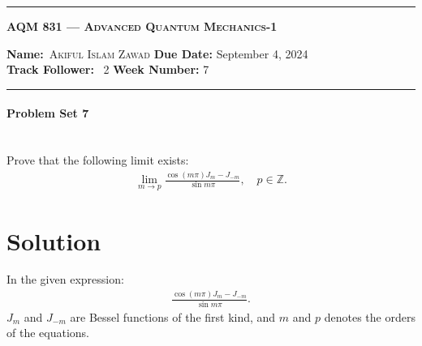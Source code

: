 \allowdisplaybreaks
\begin{center}
	\hrule
	\vspace{.4cm}
	\Large\scshape\textbf{AQM 831 --- Advanced Quantum Mechanics-1}
\end{center}
{\textbf{Name:}\ \textsc{Akiful Islam Zawad} \hspace{\hfill} \textbf{Due Date:} September 4, 2024\\[5pt]
{ \textbf{Track Follower:}} \ 2 \hspace{\hfill} \textbf{Week Number:} 7 \\
	\hrule}
\paragraph*{Problem Set 7} %
\\
Prove that the following limit exists:
\begin{align*}
    \lim_{m \to p} \frac{\cos(m\pi) J_m - J_{-m}}{\sin m\pi}, \quad p \in \mathbb{Z}.
\end{align*}
\bigskip\bigskip\hline\hline\bigskip
\section*{Solution}
In the given expression:
\begin{align*}
    \frac{\cos(m\pi) J_m - J_{-m}}{\sin m\pi}.
\end{align*}
$\displaystyle J_m$ and $\displaystyle J_{-m}$ are Bessel functions of the first kind, and $\displaystyle m$ and $\displaystyle p$ denotes the orders of the equations.

